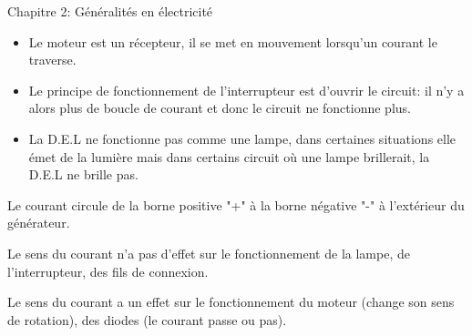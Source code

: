 \documentclass[24pt]{article}
\newcommand{\titre}{Chapitre 2: Généralités en électricité} %
\begin{document}
\thispagestyle{fancy}
\cfoot{}

\begin{titlebox}{\titre}
    \setlength\parindent{4pt} %
    \setlength\parskip{5pt} 

    \begin{itemize}
        \item Le moteur est un récepteur, il se met en mouvement lorsqu'un courant le traverse.
        \item Le principe de fonctionnement de 
        l'interrupteur est d'ouvrir le circuit: il n'y a alors plus de 
        boucle de courant et donc le circuit ne fonctionne plus.
        \item La D.E.L ne fonctionne pas comme une lampe, dans certaines situations 
        elle émet de la lumière mais dans certains circuit où une lampe brillerait, la D.E.L ne brille pas. 
    \end{itemize}
    
    
    \vspace{50pt}
    Le courant circule de la borne positive "+" 
    à la borne négative "-" à l'extérieur du générateur.

    Le sens du courant n'a pas d'effet sur le 
    fonctionnement de la lampe, de l'interrupteur, des fils de connexion.
    
    Le sens du courant a un effet sur le fonctionnement du moteur 
    (change son sens de rotation), des diodes (le
    courant passe ou pas).

    \begin{multicols}{2}
    [
    ]
    \hspace{-17pt}
    \begin{minipage}[t]{0.3\textwidth}
    \end{minipage}

    \begin{minipage}[t]{0.3\textwidth}
    \end{minipage}
    \end{multicols}
    
    


\end{titlebox}
\end{document}
